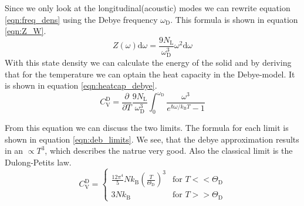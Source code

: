 Since we only look at the longitudinal(acoustic) modes we can rewrite equation \ref{eqn:freq_dens} using the Debye frequency $\omega_\mathrm{D}$. This formula is shown in equation \ref{eqn:Z_W}.
\begin{equation}
    \label{eqn:Z_w}
    Z(\omega)\mathrm{d}\omega = \frac{9N_\mathrm{L}}{\omega_{\mathrm{D}}^3}\omega^2\mathrm{d}\omega
\end{equation}
With this state density we can calculate the energy of the solid and by deriving that for the temperature we can optain the heat capacity in the Debye-model. It is shown in equation 
\ref{eqn:heatcap_debye}.
\begin{equation}
    \label{eqn:heatcap_debye}
    C_{\mathrm{V}}^{\mathrm{D}} = \frac{\partial}{\partial T}\frac{9N_\mathrm{L}}{\omega_{\mathrm{D}}^3} \int_0^{\omega_{\mathrm{D}}}\frac{\omega^3}{e^{\hbar\omega/k_\mathrm{B}T}-1}
\end{equation}

From this equation we can discuss the two limits. The formula for each limit is shown in equation \ref{eqn:deb_limits}. We see, that the debye approximation results in an $\propto T^3$, 
which describes the natrue very good. Also the classical limit is the Dulong-Petits law.
\begin{equation}
    \label{eqn:deb_limits}
    C_{\mathrm{V}}^{\mathrm{D}} =
    \begin{cases}
        \frac{12\pi^4}{5}Nk_\mathrm{B}\left(\frac{T}{\Theta_\mathrm{D}}\right)^3 & \text{for } T <<  \Theta_\mathrm{D} \\
        3Nk_\mathrm{B} & \text{for } T >>  \Theta_\mathrm{D}
    \end{cases}
\end{equation}

